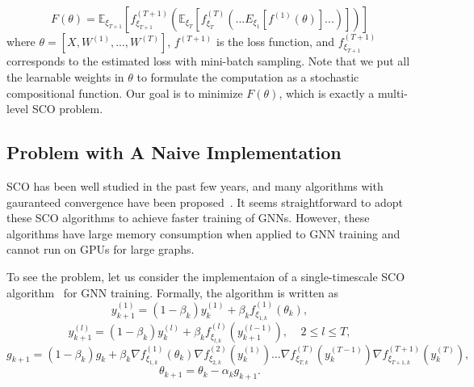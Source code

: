 \begin{equation}
\label{eq:loss}
    F(\theta) = \mathbb{E}_{\xi_{T+1}}\left[ f_{\xi_{T+1}}^{(T+1)}\left( \mathbb{E}_{\xi_{T}}\left[f_{\xi_{T}}^{(T)}\left(...{E}_{\xi_1}[f^{(1)}(\theta)]...\right)\right] \right) \right]
\end{equation}
where $\theta=[X, W^{(1)}, ..., W^{(T)}]$, $f^{(T+1)}$ is the loss function, and $f_{\xi_{T+1}}^{(T+1)}$ corresponds to the estimated loss with mini-batch sampling. 
Note that we put all the learnable weights in $\theta$ to formulate the computation as a stochastic compositional function. 
Our goal is to minimize $F(\theta)$, which is exactly a multi-level SCO problem.  



\subsection{Problem with A Naive Implementation}
SCO has been well studied in the past few years, and many algorithms with gauranteed convergence have been proposed~\cite{zhang2019multi, yang2019multilevel,  chen2020solving, yang2019multilevel, balasubramanian2020stochastic, chen2020solving, lian2017finite, wang2017accelerating, ghadimi2020single}. 
It seems straightforward to adopt these SCO algorithms to achieve faster training of GNNs. 
However, these algorithms have large memory consumption when applied to GNN training and cannot run on GPUs for large graphs.  

To see the problem, let us consider the implementaion of a single-timescale SCO algorithm~\cite{balasubramanian2020stochastic} for GNN training. 
Formally, the algorithm is written as 
\begin{equation}
  \label{eq:alg_step1}
             y^{(1)}_{k+1} = (1-\beta_{k})y^{(1)}_k + \beta_{k}  f^{(1)}_{\xi_{1,k}}(\theta_{k}),
 \end{equation}
\begin{equation}
         \label{eq:alg_step2}
      y^{(l)}_{k+1} = (1-\beta_{k})y^{(l)}_k + \beta_{k}  f^{(l)}_{\xi_{l,k}}(y^{(l-1)}_{k+1}), \;\;\;\; 2\le l \le T,
 \end{equation}
 \begin{equation}
  \label{eq:alg_step3}
g_{k+1} = (1-\beta_{k})g_{k} + \beta_{k} \nabla f_{\xi_{1,k}}^{(1)}(\theta_k) \nabla f_{\xi_{2,k}}^{(2)}(y^{(1)}_k)\ldots \nabla  f_{\xi_{T,k}}^{(T)}(y^{(T-1)}_k)\nabla f_{\xi_{T+1,k}}^{(T+1)}(y^{(T)}_k),
\end{equation}
 \begin{equation}
  \label{eq:alg_step4}
\theta_{k+1} = \theta_{k} - \alpha_k g_{k+1}.
\end{equation}

